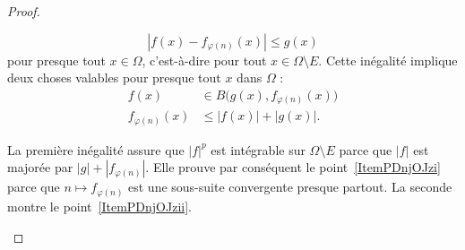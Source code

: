 \begin{proof}
\begin{subproof}
		\begin{equation}    \label{EqMQbDRac}
			| f(x)-f_{\varphi(n)}(x) |\leq g(x)
		\end{equation}
		pour presque tout \( x\in\Omega\), c'est-à-dire pour tout \( x\in\Omega\setminus E\). Cette inégalité implique deux choses valables pour presque tout \( x\) dans \( \Omega\) :
		\begin{subequations}
			\begin{align}
				f(x)              & \in B\big( g(x),f_{\varphi(n)}(x) \big) \\
				f_{\varphi(n)}(x) & \leq | f(x) |+| g(x) |.
			\end{align}
		\end{subequations}

		La première inégalité assure que \( | f |^p\) est intégrable sur \( \Omega\setminus E\) parce que \( | f |\) est majorée par \( | g |+| f_{\varphi(n)} |\). Elle prouve par conséquent le point~\ref{ItemPDnjOJzi} parce que \(n\mapsto f_{\varphi(n)}\) est une sous-suite convergente presque partout. La seconde montre le point~\ref{ItemPDnjOJzii}.


\end{subproof}
\end{proof}
